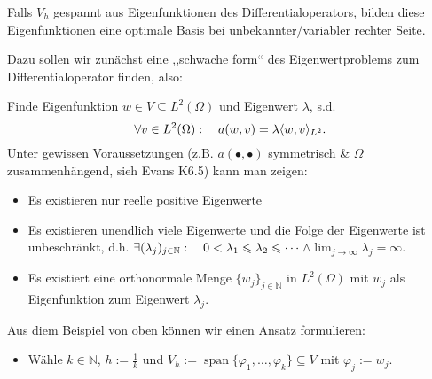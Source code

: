 \documentclass{book}
\newcommand{\assign}{:=}
\newcommand{\tmop}[1]{\ensuremath{\operatorname{#1}}}
\newcommand{\tmtextbf}[1]{\text{{\bfseries{#1}}}}
\newenvironment{itemizedot}{\begin{itemize} \renewcommand{\labelitemi}{$\bullet$}\renewcommand{\labelitemii}{$\bullet$}\renewcommand{\labelitemiii}{$\bullet$}\renewcommand{\labelitemiv}{$\bullet$}}{\end{itemize}}
\begin{document}
\begin{example*}
  \tmtextbf{(Optimales $A_h$)}
  
  Falls $V_h$ gespannt aus Eigenfunktionen des Differentialoperators, bilden
  diese Eigenfunktionen eine optimale Basis bei unbekannter/variabler rechter
  Seite.
  
  Dazu sollen wir zun{\"a}chst eine ,,schwache form`` des Eigenwertproblems
  zum Differentialoperator finden, also:
  
  Finde Eigenfunktion $w \in V \subseteq L^2 (\Omega)$ und Eigenwert
  $\lambda$, s.d.
  \[ \forall v \in L^2 (\Omega) : \text{\quad} a (w, v) = \lambda \langle w,
     v \rangle_{L^2} . \]
  {\hspace{1.7em}}Unter gewissen Voraussetzungen (z.B. $a (\bullet, \bullet)$
  symmetrisch \& $\Omega$ zusammenh{\"a}ngend, sieh Evans K6.5) kann man
  zeigen:
  \begin{itemizedot}
    \item Es existieren nur reelle positive Eigenwerte
    
    \item Es existieren unendlich viele Eigenwerte und die Folge der
    Eigenwerte ist unbeschr{\"a}nkt, d.h. $\exists (\lambda_j)_{j \in
    \mathbb{N}} : \text{\quad} 0 < \lambda_1 \leqslant \lambda_2 \leqslant
    \cdots $\quad$\wedge$\quad$\lim_{j \rightarrow \infty} \lambda_j =
    \infty$.
    
    \item Es existiert eine orthonormale Menge $\{ w_j \}_{j \in \mathbb{N}}$
    in $L^2 (\Omega)$ mit $w_j$ als Eigenfunktion zum Eigenwert $\lambda_j$. 
  \end{itemizedot}
  Aus diem Beispiel von oben k{\"o}nnen wir einen Ansatz formulieren:
  \begin{itemizedot}
    \item W{\"a}hle $k \in \mathbb{N}$, $h \assign \frac{1}{k}$ und $V_h
    \assign \tmop{span} \{ \varphi_1, \ldots, \varphi_k \} \subseteq V$ mit
    $\varphi_j \assign w_j$.
    

\end{itemizedot}
\end{example*}
\end{document}

